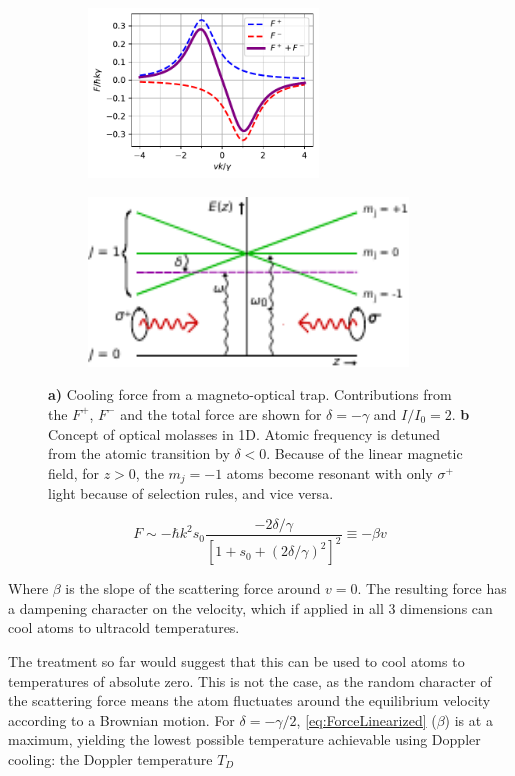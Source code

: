 \begin{figure}
	\begin{subfigure}{.42\textwidth}
		\includegraphics[height=4.5cm]{figures/MOTplot.pdf}
		\caption{}
		\label{fig:MOTcooling}
	\end{subfigure}
	\hfill
	\begin{subfigure}{.55\textwidth}
		\includegraphics[height=4.5cm]{figures/OpticalMolasses.pdf}
		\caption{}
		\label{fig:MOTconcept}
	\end{subfigure}
	\caption{\textbf{a)} Cooling force from a magneto-optical trap. Contributions from the $F^+$, $F^-$ and the total force are shown for $\delta = -\gamma$ and $I/I_0 = 2.$ \textbf{b} Concept of optical molasses in 1D. Atomic frequency is detuned from the atomic transition by $\delta<0$. Because of the linear magnetic field, for $z>0$, the $m_j=-1$ atoms become resonant with only $\sigma^+$ light because of selection rules, and vice versa.}
	\label{fig:MOTPlots}
\end{figure}

\begin{equation}\label{eq:ForceLinearized}
	F \sim - \hbar k^2 s_0 \frac{-2\delta/\gamma}{\left[1+s_0+(2\delta/\gamma)^2\right]^2} \equiv -\beta v
\end{equation}

Where $\beta$ is the slope of the scattering force around $v=0$. The resulting force has a dampening character on the velocity, which if applied in all 3 dimensions can cool atoms to ultracold temperatures. 

The treatment so far would suggest that this can be used to cool atoms to temperatures of absolute zero. This is not the case, as the random character of the scattering force means the atom fluctuates around the equilibrium velocity according to a Brownian motion. 
For $\delta=-\gamma/2$, \cref{eq:ForceLinearized} ($\beta$) is at a maximum, yielding the lowest possible temperature achievable using Doppler cooling: the Doppler temperature $T_D$ \cite{Metcalf1999}

